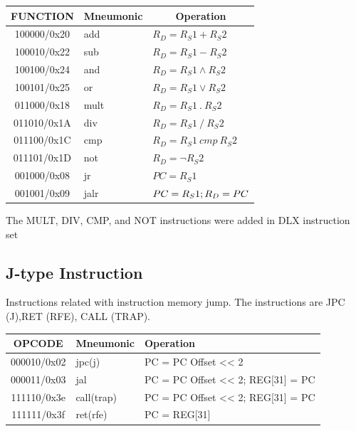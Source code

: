 \documentclass{article}
\begin{document}
  \FloatBarrier
  \begin{table}[H]
    \begin{center}
      \begin{tabular}[pos]{| c | l | l |} \hline 	
      \multicolumn{1}{|c|}{\cellcolor[gray]{0.9}\textbf{FUNCTION}} & 
      \multicolumn{1}{c|}{\cellcolor[gray]{0.9}\textbf{Mneumonic}} & 
      \multicolumn{1}{c|}{\cellcolor[gray]{0.9}\textbf{Operation}} \\ \hline
	 100000/0x20 	& add & $R_D = R_S1 + R_S2$ \\ \hline
	 100010/0x22 	& sub & $R_D = R_S1 - R_S2$ \\ \hline
	 100100/0x24 	& and & $R_D = R_S1 \land R_S2$ \\ \hline
	 100101/0x25 & or & $R_D = R_S1 \lor R_S2$ \\ \hline
	 011000/0x18 & mult & $R_D = R_S1 ~.~ R_S2$ \\ \hline
	 011010/0x1A & div & $R_D = R_S1 ~/~ R_S2$ \\ \hline
	 011100/0x1C & cmp & $R_D = R_S1 ~cmp~ R_S2$ \\ \hline
	 011101/0x1D & not & $R_D = \lnot R_S2$ \\ \hline
	 001000/0x08 & jr & $PC = R_S1$ \\ \hline
	 001001/0x09 & jalr & $PC = R_S1; \newline R_D = PC$ \\ \hline

      \end{tabular}
    \end{center}
  \end{table} 

The MULT, DIV, CMP, and NOT instructions were added in DLX instruction set

  \subsection{J-type Instruction}
Instructions related with instruction memory jump. The instructions are JPC (J),RET (RFE), CALL (TRAP).
  \FloatBarrier
  \begin{table}[H]
    \begin{center}
      \begin{tabular}[pos]{| c | l | m{9cm} |} \hline 	
      \multicolumn{1}{|c|}{\cellcolor[gray]{0.9}\textbf{OPCODE}} & 
      \multicolumn{1}{c|}{\cellcolor[gray]{0.9}\textbf{Mneumonic}} & 
      \multicolumn{1}{m{9cm}|}{\cellcolor[gray]{0.9}\textbf{Operation}} \\ \hline
	 000010/0x02 	& jpc(j) & PC = PC Offset << 2 \\ \hline
	 000011/0x03 	& jal & PC = PC Offset << 2; \newline REG[31] = PC \\ \hline
	 111110/0x3e 	& call(trap) & PC = PC Offset << 2; \newline REG[31] = PC \\ \hline
	 111111/0x3f 	& ret(rfe) & PC = REG[31] \\ \hline
	 

      \end{tabular}
    \end{center}
  \end{table} 
\end{document}
